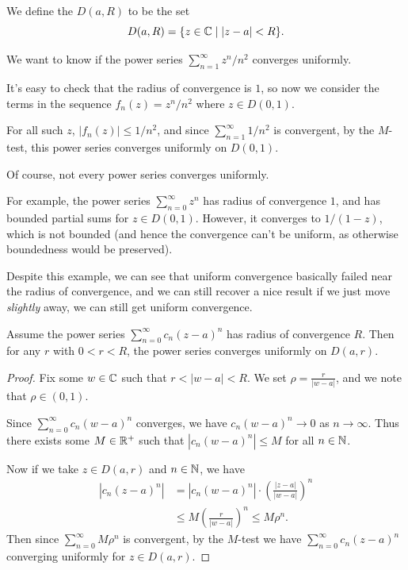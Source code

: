 \documentclass[a4paper]{scrartcl}
\begin{document}
\begin{definition}
    We define the  $D(a, R)$ to be the set 
    $$
    D(a, R) = \{ z \in \mathbb{C} \mid |z - a| < R \}.
    $$
\end{definition}

\begin{example}[Uniform Convergence of $\sum_{n = 1}^{\infty} z^n/n^2$]
    We want to know if the power series $\sum_{n = 1}^{\infty} z^n/n^2$ converges uniformly.

    It's easy to check that the radius of convergence is $1$, so now we consider the terms in the sequence $f_n(z) = z^n/n^2$ where $z \in D(0, 1)$.

    For all such $z$, $|f_n(z)| \leq 1/n^2$, and since $\sum_{n = 1}^{\infty} 1/n^2$ is convergent, by the $M$-test, this power series converges uniformly on $D(0, 1)$.
\end{example}

Of course, not every power series converges uniformly. 

For example, the power series $\sum_{n = 0}^{\infty} z^n$ has radius of convergence $1$, and has bounded partial sums for $z \in D(0, 1)$. However, it converges to $1/(1 - z)$, which is not bounded (and hence the convergence can't be uniform, as otherwise boundedness would be preserved).

Despite this example, we can see that uniform convergence basically failed near the radius of convergence, and we can still recover a nice result if we just move \emph{slightly} away, we can still get uniform convergence.

\begin{theorem}
    Assume the power series $\sum_{n = 0}^{\infty} c_n (z - a)^n$ has radius of convergence $R$. Then for any $r$ with $0 < r < R$, the power series converges uniformly on $D(a, r)$.
\end{theorem}
\begin{proof}
    Fix some $w \in \mathbb{C}$ such that $r < |w - a| < R$. We set $\rho = \frac{r}{|w - a|}$, and we note that $\rho \in (0, 1)$. 

    Since $\sum_{n = 0}^{\infty} c_n(w - a)^n$ converges, we have $c_n(w - a)^n \rightarrow 0$ as $n \rightarrow \infty$. Thus there exists some $M \in \mathbb{R}^+$ such that $|c_n(w - a)^n| \leq M$ for all $n \in \mathbb{N}$.

    Now if we take $z \in D(a, r)$ and $n \in \mathbb{N}$, we have
    \begin{align*}
        |c_n(z - a)^n| &= |c_n (w - a)^n| \cdot \left(\frac{|z - a|}{|w - a|}\right)^n \\
        &\leq M \left(\frac{r}{|w - a|}\right)^n \leq M \rho^n.
    \end{align*}
    Then since $\sum_{n = 0}^{\infty} M \rho^n$ is convergent, by the $M$-test we have $\sum_{n = 0}^{\infty} c_n(z - a)^n$ converging uniformly for $z \in D(a, r)$.
\end{proof}
\end{document}
